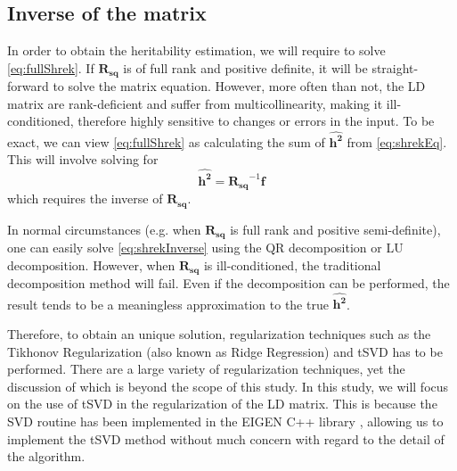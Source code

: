 		\subsection{Inverse of the  matrix}
			In order to obtain the heritability estimation, we will require to solve \cref{eq:fullShrek}. 
			If $\boldsymbol{R_{sq}}$ is of full rank and positive definite, it will be straight-forward to solve the matrix equation.
			However, more often than not, the \gls{LD} matrix are rank-deficient and suffer from multicollinearity, making it ill-conditioned, therefore highly sensitive to changes or errors in the input.
			To be exact, we can view \cref{eq:fullShrek} as calculating the sum of $\boldsymbol{\hat{h^2}}$ from  \cref{eq:shrekEq}.
			This will involve solving for
			\begin{equation}
			\boldsymbol{\hat{h^2}} = \boldsymbol{R_{sq}}^{-1}\boldsymbol{f}
			\label{eq:shrekInverse}
			\end{equation}
			which requires the inverse of $\boldsymbol{R_{sq}}$. 
			
			In normal circumstances (e.g. when $\boldsymbol{R_{sq}}$ is full rank and positive semi-definite), one can easily solve \cref{eq:shrekInverse} using the QR decomposition or LU decomposition.
			However, when $\boldsymbol{R_{sq}}$ is ill-conditioned, the traditional decomposition method will fail.
			Even if the decomposition can be performed, the result tends to be a meaningless approximation to the true $\boldsymbol{\hat{h^2}}$. 
			
			Therefore, to obtain an unique solution, regularization techniques such as the Tikhonov Regularization (also known as Ridge Regression) and \gls{tSVD} has to be performed\citep{Neumaier1998}. 
			There are a large variety of regularization techniques, yet the discussion of which is beyond the scope of this study. 
			In this study, we will focus on the use of \gls{tSVD} in the regularization of the \gls{LD} matrix.
			This is because the \gls{SVD} routine has been implemented in the EIGEN C++ library \citep{eigenweb}, allowing us to implement the \gls{tSVD} method without much concern with regard to the detail of the algorithm. 
			
